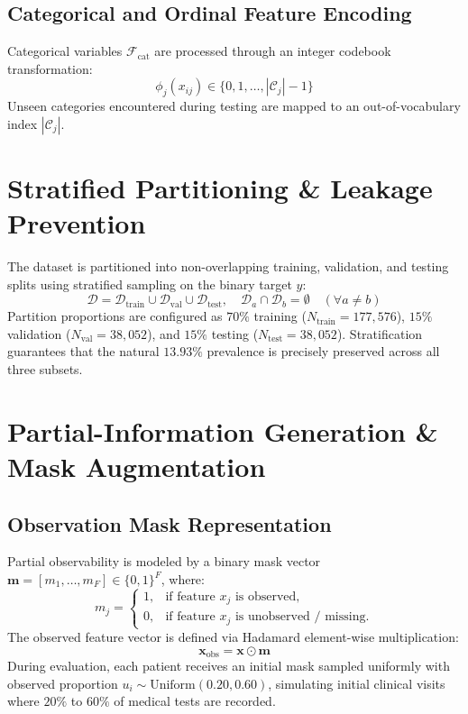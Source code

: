 \documentclass[11pt,a4paper]{report}
\begin{document}
\subsection{Categorical and Ordinal Feature Encoding}
Categorical variables $\mathcal{F}_{\text{cat}}$ are processed through an integer codebook transformation:
\begin{equation}
  \phi_j(x_{ij}) \in \{0, 1, \dots, |\mathcal{C}_j| - 1\}
\end{equation}
Unseen categories encountered during testing are mapped to an out-of-vocabulary index $|\mathcal{C}_j|$.

\section{Stratified Partitioning \& Leakage Prevention}
The dataset is partitioned into non-overlapping training, validation, and testing splits using stratified sampling on the binary target $y$:
\begin{equation}
  \mathcal{D} = \mathcal{D}_{\text{train}} \cup \mathcal{D}_{\text{val}} \cup \mathcal{D}_{\text{test}}, \quad
  \mathcal{D}_a \cap \mathcal{D}_b = \emptyset \quad (\forall a \ne b)
\end{equation}
Partition proportions are configured as $70\%$ training ($N_{\text{train}} = 177,576$), $15\%$ validation ($N_{\text{val}} = 38,052$), and $15\%$ testing ($N_{\text{test}} = 38,052$). Stratification guarantees that the natural $13.93\%$ prevalence is precisely preserved across all three subsets.

\section{Partial-Information Generation \& Mask Augmentation}

\subsection{Observation Mask Representation}
Partial observability is modeled by a binary mask vector $\mathbf{m} = [m_1, \dots, m_F] \in \{0, 1\}^F$, where:
\begin{equation}
  m_j = \begin{cases}
    1, & \text{if feature } x_j \text{ is observed}, \\
    0, & \text{if feature } x_j \text{ is unobserved / missing}.
  \end{cases}
\end{equation}
The observed feature vector is defined via Hadamard element-wise multiplication:
\begin{equation}
  \mathbf{x}_{\text{obs}} = \mathbf{x} \odot \mathbf{m}
\end{equation}
During evaluation, each patient receives an initial mask sampled uniformly with observed proportion $u_i \sim \text{Uniform}(0.20, 0.60)$, simulating initial clinical visits where $20\%$ to $60\%$ of medical tests are recorded.
\end{document}
